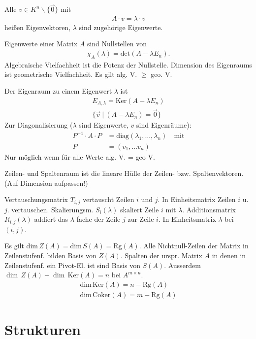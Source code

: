 \documentclass{article}
\begin{document}
\begin{multicols}{2}
Alle $v \in K^n \backslash \{\vec{0}\}$ mit
\begin{align*}
    A \cdot v = \lambda \cdot v
\end{align*}
heißen Eigenvektoren, $\lambda$ sind zugehörige Eigenwerte.

Eigenwerte einer Matrix $A$ sind Nullstellen von
\begin{align*}
    \chi_A(\lambda) = \text{det}(A - \lambda E_n).
\end{align*}
Algebraische Vielfachheit ist die Potenz der Nullstelle. Dimension des Eigenraums ist geometrische Vielfachheit. Es gilt alg. V. $\geq$ geo. V.

Der Eigenraum zu einem Eigenwert $\lambda$ ist
\begin{align*}
    E_{A,\lambda} = \text{Ker}(A - \lambda E_n) \\
    \{ \vec{v}\ |\ (A - \lambda E_n) = \vec{0} \}
\end{align*}
Zur Diagonalisierung ($\lambda$ sind Eigenwerte, $v$ sind Eigenräume):
\begin{align*}
    P^{-1} \cdot A \cdot P &= \text{diag}(\lambda_1, \ldots, \lambda_n) \quad \text{mit} \\ 
    P &= (v_1, \ldots v_n)
\end{align*}
Nur möglich wenn für alle Werte alg. V. = geo V.

Zeilen- und Spaltenraum ist die lineare Hülle der Zeilen- bzw. Spaltenvektoren. (Auf Dimension aufpassen!)

Vertauschungsmatrix $T_{i,j}$ vertauscht Zeilen $i$ und $j$. In Einheitsmatrix Zeilen $i$ u. $j.$ vertauschen. Skalierungsm. $S_i(\lambda)$ skaliert Zeile $i$ mit $\lambda$. Additionsmatrix $R_{i,j}(\lambda)$ addiert das $\lambda$-fache der Zeile $j$ zur Zeile $i$. In Einheitsmatrix $\lambda$ bei $(i, j)$.

Es gilt $\text{dim}\,Z(A) = \text{dim}\,S(A) = \text{Rg}(A)$. Alle Nichtnull-Zeilen der Matrix in Zeilenstufenf. bilden Basis von $Z(A)$. Spalten der urspr. Matrix $A$ in denen in Zeilenstufenf. ein Pivot-El. ist sind Basis von $S(A)$. Ausserdem $\dim\,Z(A) + \dim\,\text{Ker}(A) = n$ bei $A^{m \times n}$.
\begin{align*}
    \text{dim}\,\text{Ker}(A) = n - \text{Rg}(A) \\
    \text{dim}\,\text{Coker}(A) = m - \text{Rg}(A)
\end{align*}

\section*{Strukturen}


\end{multicols}
\end{document}
